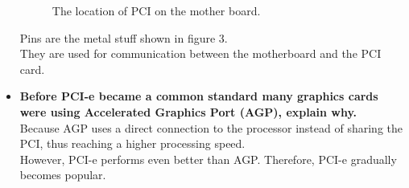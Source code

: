 \documentclass{article}
\begin{document}
\begin{itemize}
\begin{figure}[h!]
\begin{center}
	\caption{The location of PCI on the mother board.}
	\end{center}
	\end{figure}
	Pins are the metal stuff shown in figure 3.\\
	They are used for communication between the motherboard and the PCI card.
	\item \textbf{Before PCI-e became a common standard many graphics cards were using Accelerated Graphics Port (AGP), explain why.}\\
	Because AGP uses a direct connection to the processor instead of sharing the PCI, thus reaching a higher processing speed.\\
	However, PCI-e performs even better than AGP. Therefore, PCI-e gradually becomes popular.
\end{itemize}
\end{document}
